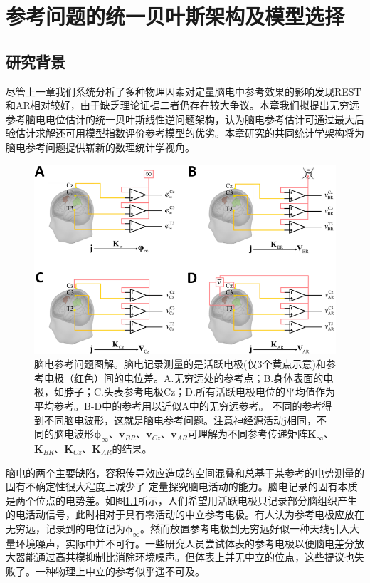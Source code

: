 \chapter{参考问题的统一贝叶斯架构及模型选择}
\section{研究背景}
尽管上一章我们系统分析了多种物理因素对定量脑电中参考效果的影响发现REST和AR相对较好，由于缺乏理论证据二者仍存在较大争议。本章我们拟提出无穷远参考脑电电位估计的统一贝叶斯线性逆问题架构，认为脑电参考估计可通过最大后验估计求解还可用模型指数评价参考模型的优劣。本章研究的共同统计学架构将为脑电参考问题提供崭新的数理统计学视角。
\begin{figure}[!h]
	\centering
	\includegraphics[width=15cm]{pic/Frontier/figure1.png}
	\caption{脑电参考问题图解。脑电记录测量的是活跃电极(仅3个黄点示意)和参考电极（红色）间的电位差。A.无穷远处的参考点；B.身体表面的电极，如脖子；C.头表参考电极Cz；D.所有活跃电极电位的平均值作为平均参考。B-D中的参考用以近似A中的无穷远参考。 不同的参考得到不同脑电波形，这就是脑电参考问题。注意神经源活动$\mathbf{j}$相同，不同的脑电波形$\mathbf{\phi}_\infty$、$\mathbf{v}_{BR}$、$\mathbf{v}_{Cz}$、$\mathbf{v}_{AR}$可理解为不同参考传递矩阵$\mathbf{K}_\infty$、$\mathbf{K}_{BR}$、$\mathbf{K}_{Cz}$、$\mathbf{K}_{AR}$的结果。}
	\label{3:1}
\end{figure}
脑电的两个主要缺陷，容积传导效应造成的空间混叠和总基于某参考的电势测量的固有不确定性很大程度上减少了
定量探究脑电活动的能力。脑电记录的固有本质是两个位点的电势差。如图\ref{3:1}所示，人们希望用活跃电极只记录部分脑组织产生的电活动信号，此时相对于具有零活动的中立参考电极。有人认为参考电极应放在无穷远，记录到的电位记为$\mathbf{\phi}_{\infty}$。然而放置参考电极到无穷远好似一种天线引入大量环境噪声，实际中并不可行。一些研究人员尝试体表的参考电极以便脑电差分放大器能通过高共模抑制比消除环境噪声。但体表上并无中立的位点，这些提议也失败了。一种物理上中立的参考似乎遥不可及。

